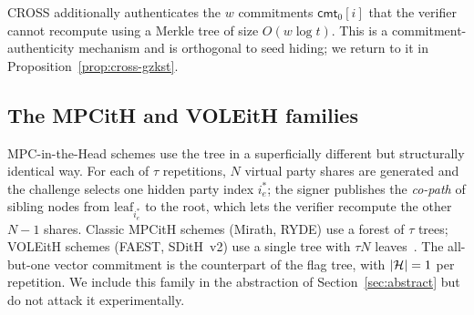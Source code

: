 CROSS additionally authenticates the $w$ commitments $\mathsf{cmt}_0[i]$ that
the verifier cannot recompute using a Merkle tree of size $O(w \log t)$. This
is a commitment-authenticity mechanism and is orthogonal to seed hiding; we
return to it in Proposition~\ref{prop:cross-gzkst}.

\subsection{The MPCitH and VOLEitH families}
\label{sec:mpcith}

MPC-in-the-Head schemes use the tree in a superficially different but
structurally identical way. For each of $\tau$ repetitions, $N$ virtual party
shares are generated and the challenge selects one hidden party index
$i^*_e$; the signer publishes the \emph{co-path} of sibling nodes from
$\mathrm{leaf}_{i^*_e}$ to the root, which lets the verifier recompute the
other $N-1$ shares. Classic MPCitH schemes (Mirath, RYDE) use a forest of
$\tau$ trees; VOLEitH schemes (FAEST, SDitH~v2) use a single tree with
$\tau N$ leaves~\cite{OneTree}. The all-but-one vector commitment is the
counterpart of the flag tree, with $|\mathcal{H}| = 1$ per repetition. We include
this family in the abstraction of Section~\ref{sec:abstract} but do not attack
it experimentally.
